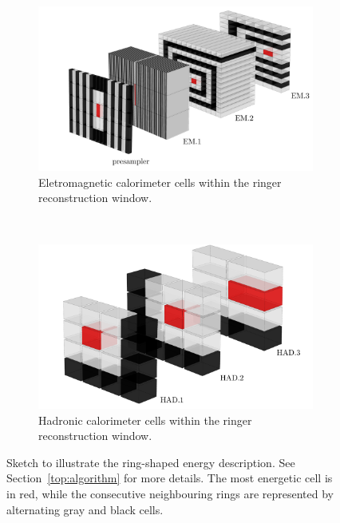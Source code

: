 \begin{figure}[h!t]
	\centering
	\begin{center}
		\begin{subfigure}[c]{.95\textwidth}
			\centering
			\includegraphics[width=\textwidth]{sections/02_context/figures/ATLAS_EM_Layers_v5.pdf}
			\caption{Eletromagnetic calorimeter cells within the ringer reconstruction window.}
		\end{subfigure} \\
		\begin{subfigure}[c]{.95\textwidth}
			\centering
			\includegraphics[width=\textwidth]{sections/02_context/figures/ATLAS_HAD_Layers_v5.pdf}
			\caption{Hadronic calorimeter cells within the ringer reconstruction window.}
		\end{subfigure}
	\end{center}
	\caption{\label{fig:calo_rings}
		Sketch to illustrate the ring-shaped energy description. See
		Section~\ref{top:algorithm} for more details. 
		The most energetic cell is in red, while the consecutive neighbouring rings are represented by alternating gray and black cells.
	}
\end{figure}


